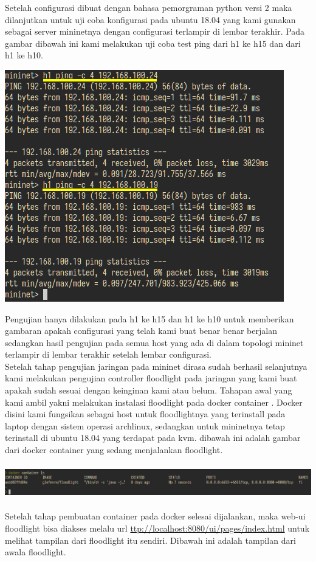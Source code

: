 Setelah configurasi dibuat dengan bahasa pemorgraman python versi 2 maka dilanjutkan untuk uji coba konfigurasi pada
ubuntu 18.04 yang kami gunakan sebagai server mininetnya dengan configurasi terlampir di lembar terakhir. Pada gambar
dibawah ini kami melakukan uji coba test ping dari h1 ke h15 dan dari h1 ke h10.

\begin{center}
\includegraphics[width=4.7807in,height=3.9681in]{gambar/h1h15h1h10.png}
\end{center}

Pengujian hanya dilakukan pada h1 ke h15 dan h1 ke h10 untuk memberikan gambaran apakah configurasi yang telah kami
buat benar benar berjalan sedangkan hasil pengujian pada semua host yang ada di dalam topologi mininet terlampir di
lembar terakhir setelah lembar configurasi. \\

Setelah tahap pengujian jaringan pada mininet dirasa sudah berhasil selanjutnya kami melakukan pengujian controller
floodlight pada jaringan yang kami buat apakah sudah sesuai dengan keinginan kami atau belum. Tahapan awal yang kami
ambil yakni melakukan instalasi floodlight pada docker container . Docker disini kami fungsikan sebagai host untuk
floodlightnya yang terinstall pada laptop dengan sistem operasi archlinux, sedangkan untuk mininetnya tetap terinstall
di ubuntu 18.04 yang terdapat pada kvm. dibawah ini adalah gambar dari docker container yang sedang menjalankan
floodlight.


\begin{center}
\includegraphics[width=6.9252in,height=0.5957in]{gambar/docker.png}
\end{center}
Setelah tahap pembuatan container pada docker selesai dijalankan, maka web-ui floodlight bisa diakses melalu url
\href{http://localhost:8080/ui/pages/index.html}{ttp://localhost:8080/ui/pages/index.html} untuk melihat tampilan dari
floodlight itu sendiri. Dibawah ini adalah tampilan dari awala floodlight.


